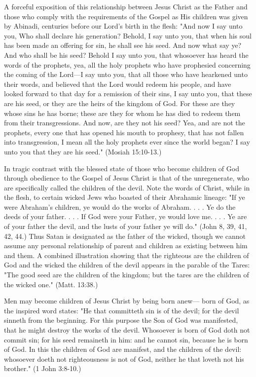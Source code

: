 A forceful exposition of this relationship between Jesus Christ as the Father and those who
comply with the requirements of the Gospel as His children was given by Abinadi, centuries
before our Lord's birth in the flesh: "And now I say unto you, Who shall declare his
generation? Behold, I say unto you, that when his soul has been made an offering for sin, he
shall see his seed. And now what say ye? And who shall be his seed? Behold I say unto you,
that whosoever has heard the words of the prophets, yea, all the holy prophets who have
prophesied concerning the coming of the Lord—I say unto you, that all those who have
hearkened unto their words, and believed that the Lord would redeem his people, and have
looked forward to that day for a remission of their sins, I say unto you, that these are his seed,
or they are the heirs of the kingdom of God. For these are they whose sins he has borne; these
are they for whom he has died to redeem them from their transgressions. And now, are they
not his seed? Yea, and are not the prophets, every one that has opened his mouth to prophesy,
that has not fallen into transgression, I mean all the holy prophets ever since the world
began? I say unto you that they are his seed." (Mosiah 15:10-13.)

In tragic contrast with the blessed state of those who become children of God through
obedience to the Gospel of Jesus Christ is that of the unregenerate, who are specifically
called the children of the devil. Note the words of Christ, while in the flesh, to certain wicked
Jews who boasted of their Abrahamic lineage: "If ye were Abraham's children, ye would do
the works of Abraham. . . . Ye do the deeds of your father. . . . If God were your Father, ye
would love me. . . . Ye are of your father the devil, and the lusts of your father ye will do."
(John 8, 39, 41, 42, 44.) Thus Satan is designated as the father of the wicked, though we
cannot assume any personal relationship of parent and children as existing between him and
them. A combined illustration showing that the righteous are the children of God and the
wicked the children of the devil appears in the parable of the Tares: "The good seed are the
children of the kingdom; but the tares are the children of the wicked one." (Matt. 13:38.)

Men may become children of Jesus Christ by being born anew— born of God, as the inspired
word states: "He that committeth sin is of the devil; for the devil sinneth from the beginning.
For this purpose the Son of God was manifested, that he might destroy the works of the devil.
Whosoever is born of God doth not commit sin; for his seed remaineth in him: and he cannot
sin, because he is born of God. In this the children of God are manifest, and the children of
the devil: whosoever doeth not righteousness is not of God, neither he that loveth not his
brother." (1 John 3:8-10.)

